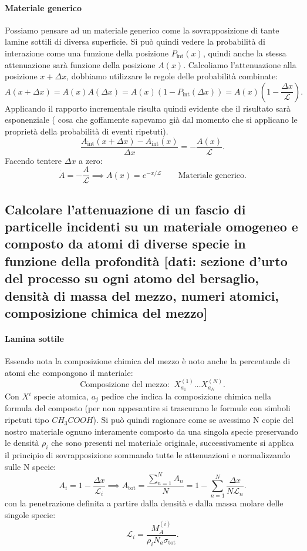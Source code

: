 \paragraph{Materiale generico} Possiamo pensare ad un materiale generico come la sovrapposizione di tante lamine sottili di diversa superficie. Si può quindi vedere la probabilità di interazione come una funzione della posizione $P_{\text{int}}\left( x \right)$, quindi anche la stessa attenuazione sarà funzione della posizione $A\left( x \right) $. Calcoliamo l'attenuazione alla posizione $x + \Delta x$, dobbiamo utilizzare le regole delle probabilità combinate:
\[
	A\left( x + \Delta x \right) = A\left( x \right) A\left( \Delta x \right) = A\left( x \right) \left( 1- P_{\text{int}}\left( \Delta x \right)  \right) = A\left( x \right) \left( 1 - \frac{\Delta x }{\mathcal{L}} \right)  
.\]
Applicando il rapporto incrementale risulta quindi evidente che il risultato sarà esponenziale ( cosa che goffamente sapevamo già dal momento che si applicano le proprietà della probabilità di eventi ripetuti).
\[
	\frac{A_{\text{int}}\left( x + \Delta x \right) - A_{\text{int}}\left( x \right)}{\Delta x} = -\frac{A\left( x \right) }{\mathcal{L}} 
.\]
Facendo tentere $\Delta x$ a zero:
\[
	\dot{A} = -\frac{A}{\mathcal{L}} \implies A\left( x \right) = e^{-x/\mathcal{L}} \quad \quad 
	\text{Materiale generico}
.\] 

\subsection[ Attenuazione di fascio di particelle su materiale omogeneo con atomi di più specie]{Calcolare l'attenuazione di un fascio di particelle incidenti su un materiale omogeneo e composto da atomi di diverse specie in funzione della profondità [dati: sezione d'urto del processo su ogni atomo del bersaglio, densità di massa del mezzo, numeri atomici, composizione chimica del mezzo]}
\paragraph{Lamina sottile}
Essendo nota la composizione chimica del mezzo è noto anche la percentuale di atomi che compongono il materiale:
\[
	\text{Composizione del mezzo: } \ X^{\left( 1 \right) }_{a_1}\ldots X^{(N)}_{a_N}
.\]
Con $X^{i}$ specie atomica, $a_j$ pedice che indica la composizione chimica nella formula del composto (per non appesantire si trascurano le formule con simboli ripetuti tipo $CH_3COOH$).
Si può quindi ragionare come se avessimo N copie del nostro materiale ognuno interamente composto da una singola specie preservando le densità $\rho_i$ che sono presenti nel materiale originale, successivamente si applica il principio di sovrapposizione sommando tutte le attenuazioni e normalizzando sulle N specie:
\[
	A_i = 1 - \frac{\Delta x}{\mathcal{L}_i} \implies A_{\text{tot}} = \frac{\sum_{n=1}^{N} A_n}{N} = 1 - \sum_{n=1}^{N} \frac{\Delta x}{N \mathcal{L}_n}
.\] 
con la penetrazione definita a partire dalla densità e dalla massa molare delle singole specie:
\[
	\mathcal{L}_i = \frac{M_{A}^{\left( i \right) }}{\rho_i N_a \sigma_{\text{tot}}}
.\]
